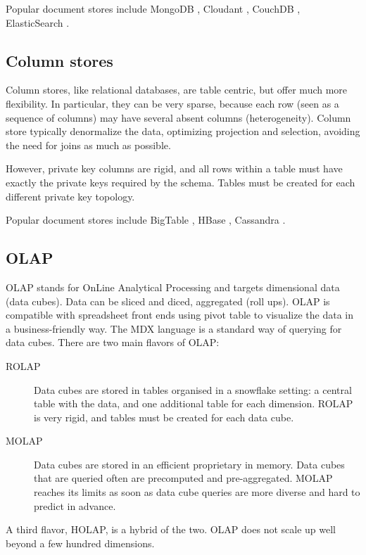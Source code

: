 \documentclass{acm_proc_article-sp}
\begin{document}
Popular document stores include MongoDB \cite{MongoDB}, Cloudant \cite{Cloudant}, CouchDB \cite{CouchDB}, ElasticSearch \cite{ElasticSearch}.

\subsection{Column stores}

Column stores, like relational databases, are table centric, but offer much more flexibility. In particular, they can be very sparse, because each row (seen as a sequence of columns) may have several absent columns (heterogeneity). Column store typically denormalize the data, optimizing projection and selection, avoiding the need for joins as much as possible.

However, private key columns are rigid, and all rows within a table must have exactly the private keys required by the schema. Tables must be created for each different private key topology.

Popular document stores include BigTable \cite{Chang2008}, HBase \cite{HBase}, Cassandra \cite{Lakshman2010}.

\subsection{OLAP}

OLAP \cite{Codd1993} stands for OnLine Analytical Processing and targets dimensional data (data cubes). Data can be sliced and diced, aggregated (roll ups). OLAP is compatible with spreadsheet front ends using pivot table to visualize the data in a business-friendly way. The MDX language \cite{Nolan1999} is a standard way of querying for data cubes. There are two main flavors of OLAP:
\begin{description}
\item[ROLAP] Data cubes are stored in tables organised in a snowflake setting: a central table with the data, and one additional table for each dimension. ROLAP is very rigid, and tables must be created for each data cube.
\item[MOLAP] Data cubes are stored in an efficient proprietary in memory. Data cubes that are queried often are precomputed and pre-aggregated. MOLAP reaches its limits as soon as data cube queries are more diverse and hard to predict in advance.
\end{description}

A third flavor, HOLAP, is a hybrid of the two. OLAP does not scale up well beyond a few hundred dimensions.
\end{document}

